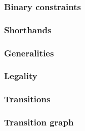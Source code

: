 \subsubsection{Binary constraints}         \label{hub: system: transaction phase flags: binarities}        
\subsubsection{Shorthands}                 \label{hub: system: transaction phase flags: shorthands}        
\subsubsection{Generalities}               \label{hub: system: transaction phase flags: generalities}      
\subsubsection{Legality}                   \label{hub: system: transaction phase flags: legality}          
\subsubsection{Transitions}                \label{hub: system: transaction phase flags: transition}        
\subsubsection{Transition graph}           \label{hub: system: transaction phase flags: transition graph}  

